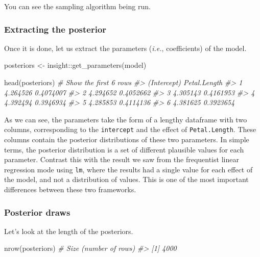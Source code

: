 \documentclass[10pt,a4paper,onecolumn]{article}
\newenvironment{Shaded}{\begin{snugshade}}{\end{snugshade}}
\newcommand{\CommentTok}[1]{\textcolor[rgb]{0.56,0.35,0.01}{\textit{#1}}}
\newcommand{\FunctionTok}[1]{\textcolor[rgb]{0.00,0.00,0.00}{#1}}
\newcommand{\NormalTok}[1]{#1}
\newcommand{\OtherTok}[1]{\textcolor[rgb]{0.56,0.35,0.01}{#1}}
\newcommand{\SpecialCharTok}[1]{\textcolor[rgb]{0.00,0.00,0.00}{#1}}
\begin{document}
You can see the sampling algorithm being run.

\hypertarget{extracting-the-posterior}{%
\subsubsection{Extracting the
posterior}\label{extracting-the-posterior}}

Once it is done, let us extract the parameters (\emph{i.e.},
coefficients) of the model.

\begin{Shaded}
\begin{Highlighting}[]
\NormalTok{posteriors }\OtherTok{\textless{}{-}}\NormalTok{ insight}\SpecialCharTok{::}\FunctionTok{get\_parameters}\NormalTok{(model)}

\FunctionTok{head}\NormalTok{(posteriors) }\CommentTok{\# Show the first 6 rows}
\CommentTok{\#\textgreater{}   (Intercept) Petal.Length}
\CommentTok{\#\textgreater{} 1    4.264526    0.4074007}
\CommentTok{\#\textgreater{} 2    4.294652    0.4052662}
\CommentTok{\#\textgreater{} 3    4.305143    0.4161953}
\CommentTok{\#\textgreater{} 4    4.392494    0.3946934}
\CommentTok{\#\textgreater{} 5    4.285853    0.4114136}
\CommentTok{\#\textgreater{} 6    4.381625    0.3923654}
\end{Highlighting}
\end{Shaded}

As we can see, the parameters take the form of a lengthy dataframe with
two columns, corresponding to the \texttt{intercept} and the effect of
\texttt{Petal.Length}. These columns contain the posterior distributions
of these two parameters. In simple terms, the posterior distribution is
a set of different plausible values for each parameter. Contrast this
with the result we saw from the frequentist linear regression mode using
\texttt{lm}, where the results had a single value for each effect of the
model, and not a distribution of values. This is one of the most
important differences between these two frameworks.

\hypertarget{posterior-draws}{%
\subsubsection{Posterior draws}\label{posterior-draws}}

Let's look at the length of the posteriors.

\begin{Shaded}
\begin{Highlighting}[]
\FunctionTok{nrow}\NormalTok{(posteriors) }\CommentTok{\# Size (number of rows)}
\CommentTok{\#\textgreater{} [1] 4000}
\end{Highlighting}
\end{Shaded}
\end{document}
